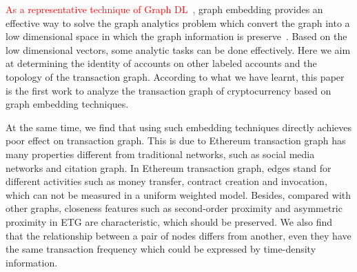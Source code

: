 


\textcolor{red}{As a representative technique of Graph DL~\cite{battaglia2018relational}, }graph embedding provides an effective way to solve the graph analytics problem which convert the graph into a low dimensional space in which the graph information is preserve~\cite{cai2018comprehensive}. Based on the low dimensional vectors, some analytic tasks can be done effectively. Here we aim at determining the identity of accounts on other labeled accounts and the topology of the transaction graph. According to what we have learnt, this paper is the first work to analyze the transaction graph of cryptocurrency based on graph embedding techniques.

At the same time, we find that using such embedding techniques directly achieves poor effect on transaction graph. This is due to Ethereum transaction graph has many properties different from traditional networks, such as social media networks and citation graph. In Ethereum transaction graph, edges stand for different activities such as money transfer, contract creation and invocation, which can not be measured in a uniform weighted model. Besides, compared with other graphs, closeness features such as second-order proximity and asymmetric proximity in ETG are characteristic, which should be preserved. We also find that the relationship between a pair of nodes differs from another, even they have the same transaction frequency which could be expressed by time-density information.

